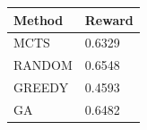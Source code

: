 \begin{tabular}{ll}
\hline
Method & Reward \\
\hline
  MCTS & 0.6329 \\
  RANDOM & 0.6548 \\
  GREEDY & 0.4593 \\
  GA & 0.6482 \\
\hline
\end{tabular}
